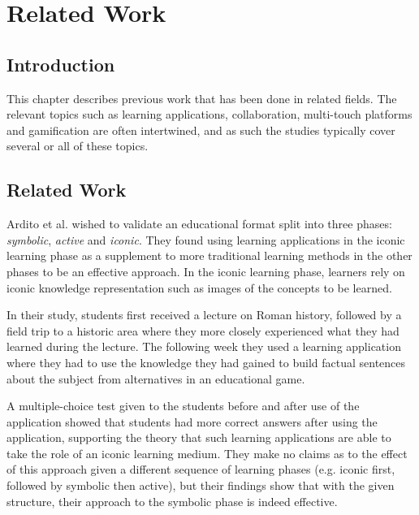
\chapter{Related Work}

\label{Chapter2}



\section{Introduction}

This chapter describes previous work that has been done in related fields. The relevant topics such as learning applications, collaboration, multi-touch platforms and gamification are often intertwined, and as such the studies typically cover several or all of these topics.


\section{Related Work}

Ardito et al.\citep{Ardito} wished to validate an educational format split into three phases: \emph{symbolic}, \emph{active} and \emph{iconic}. They found using learning applications in the iconic learning phase as a supplement to more traditional learning methods in the other phases to be an effective approach. In the iconic learning phase, learners rely on iconic knowledge representation such as images of the concepts to be learned.

In their study, students first received a lecture on Roman history, followed by a field trip to a historic area where they more closely experienced what they had learned during the lecture. The following week they used a learning application where they had to use the knowledge they had gained to build factual sentences about the subject from alternatives in an educational game.

A multiple-choice test given to the students before and after use of the application showed that students had more correct answers after using the application, supporting the theory that such learning applications are able to take the role of an iconic learning medium. They make no claims as to the effect of this approach given a different sequence of learning phases (e.g. iconic first, followed by symbolic then active), but their findings show that with the given structure, their approach to the symbolic phase is indeed effective.

